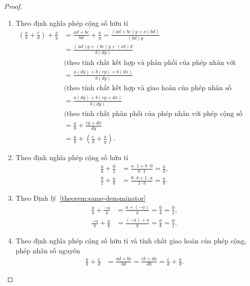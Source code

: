 \begin{proof}
	\begin{enumerate}[label={(\roman*)}]
		\item Theo định nghĩa phép cộng số hữu tỉ
		      \begin{align*}
			      \left(\frac{a}{b} + \frac{c}{d}\right) + \frac{x}{y} & = \frac{a d + b c}{b d} + \frac{x}{y} = \frac{(a d + b c) y + x (b d)}{(b d) y}    \\
			                                                           & = \frac{(a d) y + (b c) y +  (x b) d}{b (d y)}                                     \\
			                                                           & \text{(theo tính chất kết hợp và phân phối của phép nhân với phép cộng số nguyên)} \\
			                                                           & = \frac{a (d y) + b (c y) + b(dx)}{b (d y)}                                        \\
			                                                           & \text{(theo tính chất kết hợp và giao hoán của phép nhân số nguyên)}               \\
			                                                           & = \frac{a (d y) + b (c y + dx)}{b (d y)}                                           \\
			                                                           & \text{(theo tính chất phân phối của phép nhân với phép cộng số nguyên)}            \\
			                                                           & = \frac{a}{b} + \frac{c y + dx}{d y}                                               \\
			                                                           & = \frac{a}{b} + \left(\frac{c}{d} + \frac{x}{y}\right).
		      \end{align*}
		\item Theo định nghĩa phép cộng số hữu tỉ
		      \begin{align*}
			      \frac{a}{b} + \frac{0}{1} & = \frac{a\cdot 1 + b\cdot 0}{b\cdot 1} = \frac{a}{b}, \\
			      \frac{0}{1} + \frac{a}{b} & = \frac{0\cdot b + 1\cdot a}{1\cdot b} = \frac{a}{b}.
		      \end{align*}
		\item Theo Định lý~\ref{theorem:same-denominator}
		      \begin{align*}
			      \frac{a}{b} + \frac{-a}{b} & = \frac{a + (-a)}{b} = \frac{0}{b} = \frac{0}{1}, \\
			      \frac{-a}{b} + \frac{a}{b} & = \frac{(-a) + a}{b} = \frac{0}{b} = \frac{0}{1}.
		      \end{align*}
		\item Theo định nghĩa phép cộng số hữu tỉ và tính chất giao hoán của phép cộng, phép nhân số nguyên
		      \begin{align*}
			      \frac{a}{b} + \frac{c}{d} & = \frac{ad + bc}{bd} = \frac{cb + da}{db} = \frac{c}{d} + \frac{a}{b}.
		      \end{align*}
	\end{enumerate}
\end{proof}

